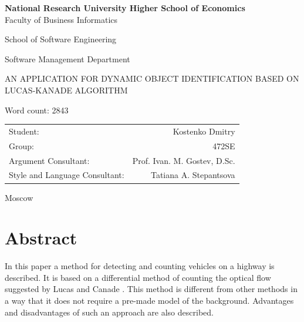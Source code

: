 \documentclass[12pt,a4paper,oneside,titlepage]{article}
\author{Kostenko}
\begin{document}
{
\thispagestyle{empty}
\newpage
\centering

\textbf{
National Research University Higher School of Economics\\
}
Faculty of Business Informatics

School of Software Engineering

Software Management Department

\vfill


\begin{large}
\MakeTextUppercase{
An Application for Dynamic Object Identification Based on Lucas-Kanade Algorithm
}
\end{large}

\vfill

\hfill Word count: 2843

\vfill

\begin{tabular}{lr}
Student: & Kostenko Dmitry \\
Group: & 472SE \\
Argument Consultant: & Prof. Ivan. M. Gostev, D.Sc. \\
Style and Language Consultant: & Tatiana A. Stepantsova
\end{tabular}

\vspace{\fill}

Moscow\\ \number\year
\clearpage
}

\section*{Abstract}
{

In this paper a method for detecting and counting vehicles on a highway is described. 
It is based on a differential method of counting the optical flow suggested by Lucas and Canade \cite{lucaskanade}. 
This method is different from other methods in a way that it does not require a pre-made model of the background. 
Advantages and disadvantages of such an approach are also described.


}
\end{document}
